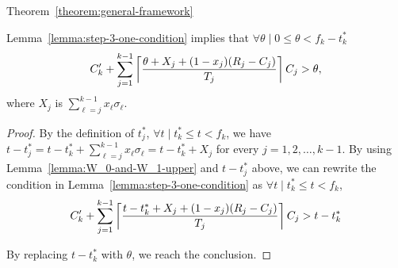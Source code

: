 \begin{appProof}{Theorem~\ref{theorem:general-framework}}
\begin{Lemma}
\label{lemma:step-3-ceiling-condition}
Lemma~\ref{lemma:step-3-one-condition} implies that
$\forall \theta \mid 0 \leq \theta < f_k-t_k^*$
\begin{equation}
\label{eq:exec_plus_idle-almost-final-before-replacing-sigma} 
C_k'+\sum_{j=1}^{k-1} \ceiling{\frac{\theta+X_j+(1-x_j)(R_j-C_j)}{T_j}} C_j > \theta,
\end{equation}
where $X_j$ is $\sum_{\ell=j}^{k-1} x_\ell\sigma_\ell$. 
\end{Lemma}
\begin{proof}
  By the definition of $t_j^*$, $\forall t \mid t_k^* \leq t < f_k$,
  we have $t-t_j^* = t - t_k^* + \sum_{\ell=j}^{k-1}
  x_\ell\sigma_\ell = t-t_k^* + X_j$ for every $j=1,2,\ldots,k-1$. By using Lemma~\ref{lemma:W_0-and-W_1-upper} and $t-t_j^*$ above, we can rewrite the condition in Lemma~\ref{lemma:step-3-one-condition} as $\forall t \mid t_k^* \leq t < f_k$,
\begin{equation*}
C_k'+\sum_{j=1}^{k-1} \left\lceil{\frac{t-t_k^*+X_j+(1-x_j)(R_j-C_j)}{T_j}}\right\rceil C_j > t-t_k^*
\end{equation*}

  By replacing $t-t_k^*$ with $\theta$, we reach the conclusion.
\end{proof}



\end{appProof}
